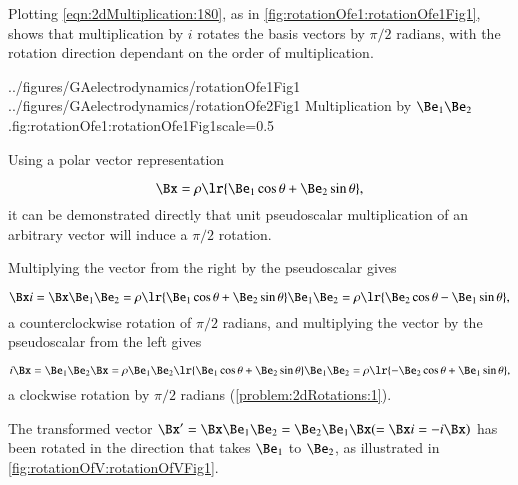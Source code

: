 %
%

Plotting \cref{eqn:2dMultiplication:180}, as in
\cref{fig:rotationOfe1:rotationOfe1Fig1},
 shows that multiplication by \( i \) rotates the  basis vectors by \( \pi/2 \) radians,
with the
rotation direction dependant on the order of multiplication.

\imageTwoFigures
{../figures/GAelectrodynamics/rotationOfe1Fig1}
{../figures/GAelectrodynamics/rotationOfe2Fig1}
{Multiplication by \( \Be_1 \Be_2 \).}{fig:rotationOfe1:rotationOfe1Fig1}{scale=0.5}

Using a polar vector representation

\begin{dmath}\label{eqn:2dRotations:280}
   \Bx = \rho \lr{ \Be_1 \cos\theta + \Be_2 \sin\theta },
\end{dmath}
it can be demonstrated directly that
unit pseudoscalar multiplication of an arbitrary vector will induce a \( \pi/2 \) rotation.

Multiplying the vector from the right by the pseudoscalar gives

\begin{dmath}\label{eqn:2dRotations:300}
\Bx i
= \Bx \Be_1 \Be_2
= \rho \lr{ \Be_1 \cos\theta + \Be_2 \sin\theta } \Be_1 \Be_2
= \rho \lr{ \Be_2 \cos\theta - \Be_1 \sin\theta },
\end{dmath}
a counterclockwise rotation of \( \pi/2 \) radians, and
multiplying the vector by the pseudoscalar from the left gives

\begin{dmath}\label{eqn:2dRotations:3}
i \Bx
= \Be_1 \Be_2 \Bx
= \rho \Be_1 \Be_2 \lr{ \Be_1 \cos\theta + \Be_2 \sin\theta } \Be_1 \Be_2
= \rho \lr{ -\Be_2 \cos\theta + \Be_1 \sin\theta },
\end{dmath}
a clockwise rotation by \( \pi/2 \) radians
(\cref{problem:2dRotations:1}).

The transformed vector \( \Bx' = \Bx \Be_1 \Be_2 = \Be_2 \Be_1 \Bx (=\Bx i = -i \Bx) \) has been rotated in the direction that takes \( \Be_1 \) to \( \Be_2 \), as illustrated
in \cref{fig:rotationOfV:rotationOfVFig1}.


